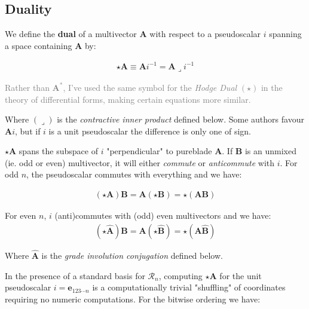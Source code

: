 \documentclass[a4paper]{book}
\numberwithin{equation}{chapter}
\begin{document}
    \subsection{Duality}

We define the \textbf{dual} of a multivector $\mathbf{A}$ 
with respect to a pseudoscalar $i$ spanning a space containing $\mathbf{A}$ by:

\begin{align}
\star\mathbf{A} \equiv \mathbf{A}i^{-1} = \mathbf{A}\lrcorner i^{-1}
    \label{dualdef}
\end{align}

\textcolor{gray}{Rather than $\mathbf{A}^*$, I've used the same symbol for the
\emph{Hodge Dual} $(\star)$ in the theory of differential forms, making certain 
equations more similar.}

\vspace{\baselineskip}

Where $(\lrcorner)$ is the \emph{contractive inner product} defined below. 
Some authors favour $\mathbf{A}i$, but if $i$ is a unit pseudoscalar the difference is only one of sign.

\vspace{\baselineskip}

$\star \mathbf{A}$ spans the subspace of $i$ "perpendicular" to pureblade $\mathbf{A}$.
If $\mathbf{B}$ is an unmixed (ie. odd or even) multivector, it will either 
\emph{commute} or \emph{anticommute} with $i$. For odd $n$, 
the pseudoscalar commutes with everything and we have: 

\begin{align*}
    (\star \mathbf{A})\mathbf{B} = \mathbf{A (\star B)} = \mathbf{\star(AB)}
\end{align*}

For even $n$, $i$ (anti)commutes with (odd) even multivectors and we have:
\begin{align*}
    (\star \widehat{\mathbf{A}} )\mathbf{B} = \mathbf{A}(\star\widehat{\mathbf{B}}) = \star(\mathbf{A}\widehat{\mathbf{B}})
\end{align*}

Where $\widehat{\mathbf{A}}$ is the \emph{grade involution conjugation} defined below.

\vspace{\baselineskip}

In the presence of a standard basis for $\mathcal{R}_n$, computing $\star\mathbf{A}$ 
for the unit pseudoscalar $i=\mathbf{e}_{123\cdots n}$ is a computationally trivial "shuffling" 
of coordinates requiring no numeric computations. For the bitwise ordering we have:
\end{document}
